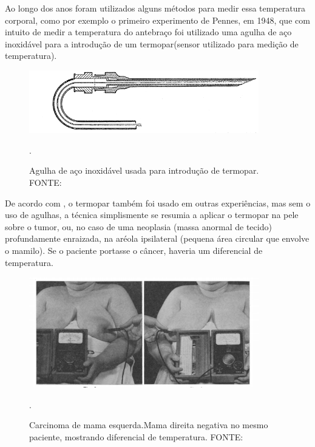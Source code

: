    
   
  
  Ao longo dos anos foram utilizados alguns métodos para medir essa  temperatura corporal, como por exemplo o primeiro experimento de Pennes, em 1948, que com intuito de medir a temperatura do antebraço  foi utilizado uma agulha de aço inoxidável para a introdução de um termopar(sensor utilizado para medição de temperatura).
 
 \begin{figure}[h]
\centering
\includegraphics[width=10cm]{figuras/agulha.png}
\caption{Agulha de aço inoxidável usada para introdução de termopar. FONTE: \cite{PENNES}}.
\label{figura 1:Agulha }
\end{figure}

De acordo com \cite{Lawson}, o termopar também foi usado em outras experiências, mas sem o uso de agulhas, a técnica simplismente se resumia a aplicar o termopar  na pele sobre o tumor, ou, no caso de uma neoplasia (massa anormal de tecido) profundamente enraizada, na aréola ipsilateral (pequena área circular que envolve o mamilo). Se o paciente portasse o câncer, haveria um diferencial de temperatura.
 
 
 \begin{figure}[h]
\centering
\includegraphics[width=10cm]{figuras/termopar_na_mama.png}
\caption{Carcinoma de mama esquerda.Mama direita negativa no mesmo paciente, mostrando
diferencial de temperatura. FONTE: \cite{Lawson}}.
\label{figura 2 :termopar na mama}
\end{figure}

